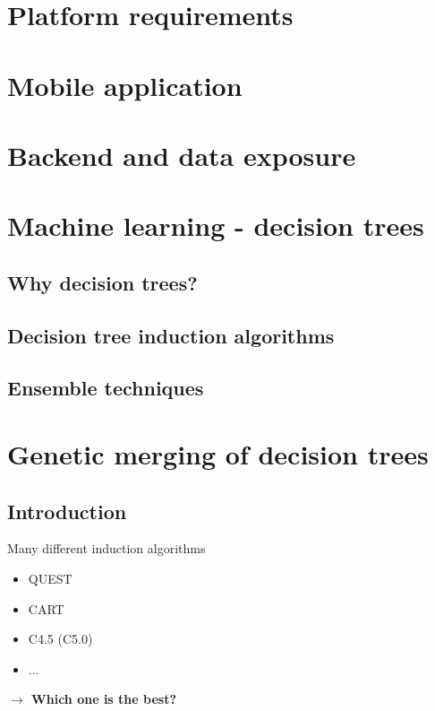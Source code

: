 \documentclass[english]{beamer}
\begin{document}
\section{Platform requirements}
\label{sec:simMess}
\section{Mobile application}
\section{Backend and data exposure}
\section{Machine learning - decision trees}

\subsection*{Why decision trees?}

\subsection*{Decision tree induction algorithms}

\subsection*{Ensemble techniques}

\section{Genetic merging of decision trees}
\subsection*{Introduction}

\begin{frame}{Many different induction algorithms}
	\begin{itemize}
		\item QUEST
		\item CART
		\item C4.5 (C5.0)
		\item $\ldots$
	\end{itemize} \vspace{2em}
	\textbf{$\rightarrow$ Which one is the best?}
\end{frame}
\end{document}
